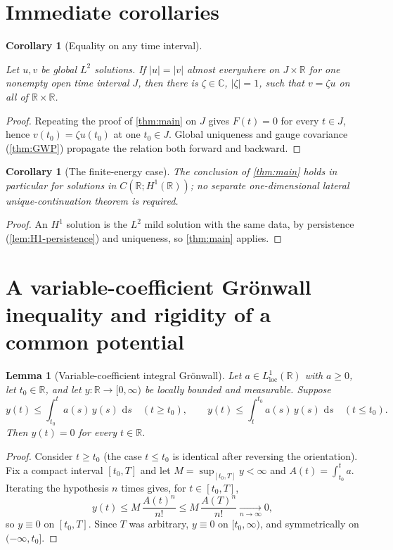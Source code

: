\documentclass[11pt,oneside]{book}
\providecommand{\uses}[1]{}
\newtheorem{lemma}[theorem]{Lemma}
\newtheorem{corollary}[theorem]{Corollary}
\theoremstyle{definition}
\theoremstyle{remark}
\newcommand{\R}{\mathbb R}
\newcommand{\C}{\mathbb C}
\newcommand{\1}{\mathbf 1}
\newcommand{\loc}{\mathrm{loc}}
\newcommand{\dd}{\,\mathrm d}
\begin{document}
\section{Immediate corollaries}

\begin{corollary}[Equality on any time interval]\label{cor:interval-version}
\uses{thm:GWP}
Let $u,v$ be global $L^2$ solutions.  If $|u|=|v|$ almost everywhere on
$J\times\R$ for one nonempty open time interval $J$, then there is $\zeta\in\C$,
$|\zeta|=1$, such that $v=\zeta u$ on all of $\R\times\R$.
\end{corollary}

\begin{proof}
\uses{thm:main, thm:GWP}
Repeating the proof of \cref{thm:main} on $J$ gives $F(t)=0$ for every $t\in J$,
hence $v(t_0)=\zeta u(t_0)$ at one $t_0\in J$.  Global uniqueness and gauge
covariance (\cref{thm:GWP}) propagate the relation both forward and backward.
\end{proof}

\begin{corollary}[The finite-energy case]\label{cor:H1-case}
The conclusion of \cref{thm:main} holds in particular for solutions in
$C(\R;H^1(\R))$; no separate one-dimensional lateral unique-continuation
theorem is required.
\end{corollary}

\begin{proof}
\uses{thm:main, lem:H1-persistence}
An $H^1$ solution is the $L^2$ mild solution with the same data, by persistence
(\cref{lem:H1-persistence}) and uniqueness, so \cref{thm:main} applies.
\end{proof}

\section{A variable-coefficient Gr\"onwall inequality and rigidity of a common potential}

\begin{lemma}[Variable-coefficient integral Gr\"onwall]\label{lem:integral-gronwall}
Let $a\in L^1_{\loc}(\R)$ with $a\ge0$, let $t_0\in\R$, and let
$y:\R\to[0,\infty)$ be locally bounded and measurable.  Suppose
\[
 y(t)\le\int_{t_0}^t a(s)\,y(s)\,\dd s\quad(t\ge t_0),
 \qquad
 y(t)\le\int_{t}^{t_0} a(s)\,y(s)\,\dd s\quad(t\le t_0).
\]
Then $y(t)=0$ for every $t\in\R$.
\end{lemma}

\begin{proof}
Consider $t\ge t_0$ (the case $t\le t_0$ is identical after reversing the
orientation).  Fix a compact interval $[t_0,T]$ and let
$M=\sup_{[t_0,T]}y<\infty$ and $A(t)=\int_{t_0}^t a$.  Iterating the hypothesis
$n$ times gives, for $t\in[t_0,T]$,
\[
 y(t)\le M\,\frac{A(t)^n}{n!}\le M\,\frac{A(T)^n}{n!}\xrightarrow[n\to\infty]{}0 ,
\]
so $y\equiv0$ on $[t_0,T]$.  Since $T$ was arbitrary, $y\equiv0$ on $[t_0,\infty)$,
and symmetrically on $(-\infty,t_0]$.
\end{proof}
\end{document}
